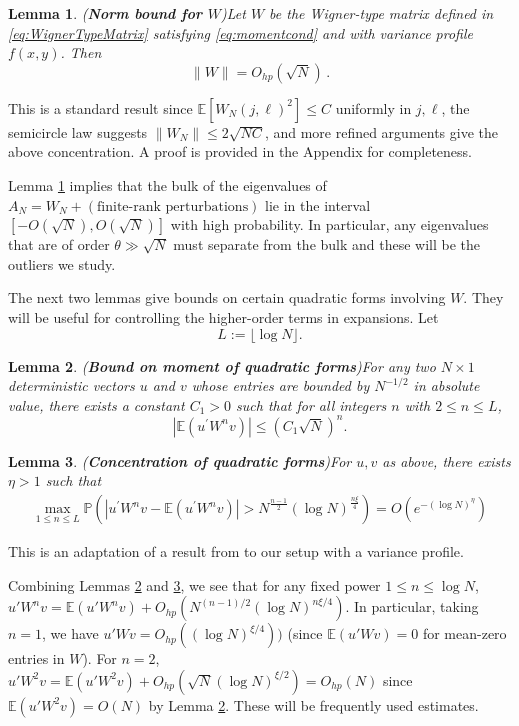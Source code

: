 \documentclass[11pt, reqno]{amsart}
\numberwithin{equation}{section}
\newtheorem{lemma}{Lemma}[section]
\newcommand{\E}{\mbox{${\mathbb E}$}}
\begin{document}
\begin{lemma}({\bf Norm bound for $W$})\label{lemma:NormBound} Let $W$ be the Wigner-type matrix defined in \eqref{eq:WignerTypeMatrix} satisfying \eqref{eq:momentcond} and with variance profile $f(x,y)$. Then \[
\|W\| = O_{hp}(\sqrt{N})\,.
\]
\end{lemma}
This is a standard result since $\E[W_N(j,\ell)^2] \le C$ uniformly in $j,\ell$, the semicircle law suggests $\|W_N\| \leq 2\sqrt{N C}$, and more refined arguments give the above concentration. A proof is provided in the Appendix for completeness.

Lemma \ref{lemma:NormBound} implies that the bulk of the eigenvalues of $A_N = W_N + (\text{finite-rank perturbations})$ lie in the interval $[-O(\sqrt{N}), O(\sqrt{N})]$ with high probability. In particular, any eigenvalues that are of order $\theta \gg \sqrt{N}$ must separate from the bulk and these will be the outliers we study.

The next two lemmas give bounds on certain quadratic forms involving $W$. They will be useful for controlling the higher-order terms in expansions. Let $$L := \lfloor \log N \rfloor.$$

\begin{lemma}({\bf Bound on moment of quadratic forms})\label{ExpectationBound} For any two $N\times 1$ deterministic vectors $u$ and $v$ whose entries are bounded by $N^{-1/2}$ in absolute value, there exists a constant $C_1>0$ such that for all integers $n$ with $2 \le n \le L$,
\[
|\mathbb E(u^\prime W^n v)| \le (C_1\sqrt{N})^n.
\]
\end{lemma}
\begin{lemma}({\bf Concentration of quadratic forms})\label{ConcentrationBound} For $u,v$ as above, there exists $\eta>1$ such that
\begin{align}
\max _{1 \le n \le L}\mathbb P\left(\left|u^\prime W^n v - \mathbb E(u^\prime W^n v)\right| > N^{\frac{n-1}{2}}(\log N)^{\frac{n\xi}{4}}\right) = O(e^{-(\log N)^\eta})
\end{align}
\end{lemma}
This is an adaptation of a result from \cite{erdHos2013spectral} to our setup with a variance profile.

Combining Lemmas \ref{ExpectationBound} and \ref{ConcentrationBound}, we see that for any fixed power $1\le n \le \log N$, $u' W^n v = \E(u'W^n v) + O_{hp}(N^{(n-1)/2} (\log N)^{n\xi/4})$. In particular, taking $n=1$, we have $u' W v = O_{hp}((\log N)^{\xi/4}))$ (since $\E(u' W v)=0$ for mean-zero entries in $W$). For $n=2$, $u' W^2 v = \E(u'W^2 v) + O_{hp}(\sqrt{N} (\log N)^{\xi/2}) = O_{hp}(N)$ since $\E(u' W^2 v) = O(N)$ by Lemma \ref{ExpectationBound}. These will be frequently used estimates.
\end{document}
